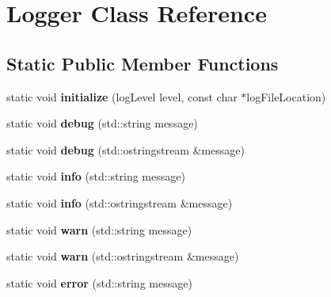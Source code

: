\hypertarget{classLogger}{
\section{\-Logger \-Class \-Reference}
\label{db/d67/classLogger}
}
\subsection*{\-Static \-Public \-Member \-Functions}
\begin{DoxyCompactItemize}
\item 
\hypertarget{classLogger_a350a1f95debbed53f733dbe470da46db}{
static void {\bfseries initialize} (log\-Level level, const char $\ast$log\-File\-Location)}
\label{db/d67/classLogger_a350a1f95debbed53f733dbe470da46db}

\item 
\hypertarget{classLogger_a49c409b258945c25b9bef8b1d1d8ced7}{
static void {\bfseries debug} (std\-::string message)}
\label{db/d67/classLogger_a49c409b258945c25b9bef8b1d1d8ced7}

\item 
\hypertarget{classLogger_a1dbeeae2a8293966cbb69c9f416cb48b}{
static void {\bfseries debug} (std\-::ostringstream \&message)}
\label{db/d67/classLogger_a1dbeeae2a8293966cbb69c9f416cb48b}

\item 
\hypertarget{classLogger_ae14f5d9d3092f9a3c40d1dc8f7d2ca7a}{
static void {\bfseries info} (std\-::string message)}
\label{db/d67/classLogger_ae14f5d9d3092f9a3c40d1dc8f7d2ca7a}

\item 
\hypertarget{classLogger_a00872f9d854d6da34c70288930d74ee0}{
static void {\bfseries info} (std\-::ostringstream \&message)}
\label{db/d67/classLogger_a00872f9d854d6da34c70288930d74ee0}

\item 
\hypertarget{classLogger_adfa9532f8fbb7b8bd558f15f73166c78}{
static void {\bfseries warn} (std\-::string message)}
\label{db/d67/classLogger_adfa9532f8fbb7b8bd558f15f73166c78}

\item 
\hypertarget{classLogger_a88571fd8a113fa4552df0921625716e5}{
static void {\bfseries warn} (std\-::ostringstream \&message)}
\label{db/d67/classLogger_a88571fd8a113fa4552df0921625716e5}

\item 
\hypertarget{classLogger_adfb307fbef0a8016664a052530aa65c8}{
static void {\bfseries error} (std\-::string message)}
\label{db/d67/classLogger_adfb307fbef0a8016664a052530aa65c8}


\end{DoxyCompactItemize}
